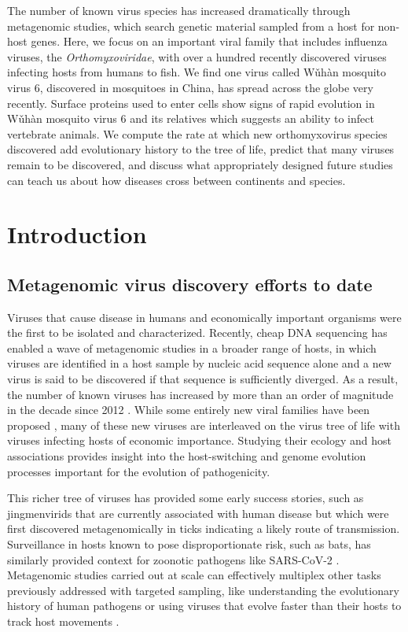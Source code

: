\documentclass[11pt]{article}
\begin{document}
The number of known virus species has increased dramatically through metagenomic studies, which search genetic material sampled from a host for non-host genes.
Here, we focus on an important viral family that includes influenza viruses, the \textit{Orthomyxoviridae}, with over a hundred recently discovered viruses infecting hosts from humans to fish.
We find one virus called W\v{u}h\`{a}n mosquito virus 6, discovered in mosquitoes in China, has spread across the globe very recently.
Surface proteins used to enter cells show signs of rapid evolution in W\v{u}h\`{a}n mosquito virus 6 and its relatives which suggests an ability to infect vertebrate animals.
We compute the rate at which new orthomyxovirus species discovered add evolutionary history to the tree of life, predict that many viruses remain to be discovered, and discuss what appropriately designed future studies can teach us about how diseases cross between continents and species.


\section{Introduction}


\subsection{Metagenomic virus discovery efforts to date}

Viruses that cause disease in humans and economically important organisms were the first to be isolated and characterized.
Recently, cheap DNA sequencing has enabled a wave of metagenomic studies in a broader range of hosts, in which viruses are identified in a host sample by nucleic acid sequence alone and a new virus is said to be discovered if that sequence is sufficiently diverged.
As a result, the number of known viruses has increased by more than an order of magnitude in the decade since 2012 \citep{roux_metagenomics_2021}.
While some entirely new viral families have been proposed \citep{obbard_new_2020}, many of these new viruses are interleaved on the virus tree of life with viruses infecting hosts of economic importance.
Studying their ecology \citep{shi_stable_2019} and host associations \citep{li_unprecedented_2015,shi_evolutionary_2018} provides insight into the host-switching and genome evolution processes important for the evolution of pathogenicity.


This richer tree of viruses has provided some early success stories, such as jingmenvirids that are currently associated with human disease \citep{wang_new_2019} but which were first discovered metagenomically in ticks \citep{qin_tick-borne_2014} indicating a likely route of transmission.
Surveillance in hosts known to pose disproportionate risk, such as bats, \citep{ge_coexistence_2016} has similarly provided context for zoonotic pathogens like SARS-CoV-2 \citep{wu_new_2020}.
Metagenomic studies carried out at scale can effectively multiplex other tasks previously addressed with targeted sampling, like understanding the evolutionary history of human pathogens \citep{keele_chimpanzee_2006} or using viruses that evolve faster than their hosts to track host movements \citep{wheeler_spatial_2010}.
\end{document}
